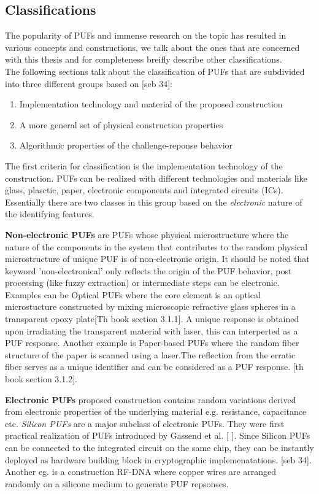 \subsection{Classifications}
The popularity of PUFs and immense research on the topic has resulted in various concepts and constructions, we talk about the ones that are concerned with this thesis and for completeness breifly describe other classifications.\\
The following sections talk about the classification of PUFs that are subdivided into three different groups based on [seb 34]:
\begin{enumerate}
	\item Implementation technology and material of the proposed construction
	\item A more general set of physical construction properties
	\item Algorithmic properties of the challenge-reponse behavior
\end{enumerate}

The first criteria for classification is the implementation technology of the construction. PUFs can be realized with different technologies and materials like glass, plasctic, paper, electronic components and integrated circuits (ICs). Essentially there are two classes in this group based on the \emph{electronic} nature of the identifying features.

\textbf{Non-electronic PUFs} are PUFs whose physical microstructure where the nature of the components in the system that contributes to the random physical microstructure of unique PUF is of non-electronic origin. It should be noted that keyword 'non-electronical' only reflects the origin of the PUF behavior, post processing (like fuzzy extraction) or intermediate steps can be electronic. Examples can be Optical PUFs where the core element is an optical microstucture constructed by mixing microscopic refractive glass spheres in a transparent epoxy plate[Th book section 3.1.1]. A unique response is obtained upon irradiating the transparent material with laser, this can interperted as a PUF response. Another example is Paper-based PUFs where the random fiber structure of the paper is scanned using a laser.The reflection from the erratic fiber serves as a unique identifier and can be considered as a PUF response. [th book section 3.1.2].

\textbf{Electronic PUFs} proposed construction contains random variations derived from electronic properties of the underlying material e.g. resistance, capacitance etc. \emph{Silicon PUFs} are a major subclass of electronic PUFs. They were first practical realization of PUFs introduced by Gassend et al. [ ]. Since Silicon PUFs can be connected to the integrated circuit on the same chip, they can be instantly deployed as hardware building block in cryptographic implemenatations. [seb 34]. Another eg. is a construction RF-DNA where copper wires are arranged randomly on a silicone medium to generate PUF repsonses.\\

